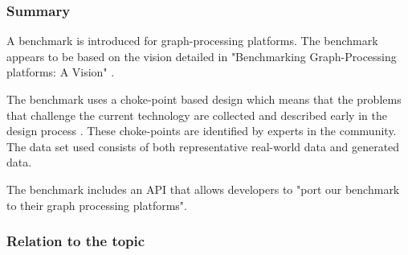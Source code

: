 \cite{capotua2015graphalytics}

\subsubsection{Summary}
A benchmark is introduced for graph-processing platforms. The benchmark appears to be based on the vision detailed in "Benchmarking Graph-Processing platforms: A Vision" \cite{guo2014benchmarking}.

The benchmark uses a choke-point based design which means that the problems that challenge the current technology are collected and described early in the design process \cite{ChokePoint}. These choke-points are identified by experts in the community. The data set used consists of both representative real-world data and generated data.

The benchmark includes an API that allows developers to "port our benchmark to their graph processing platforms".
\subsubsection{Relation to the topic}

